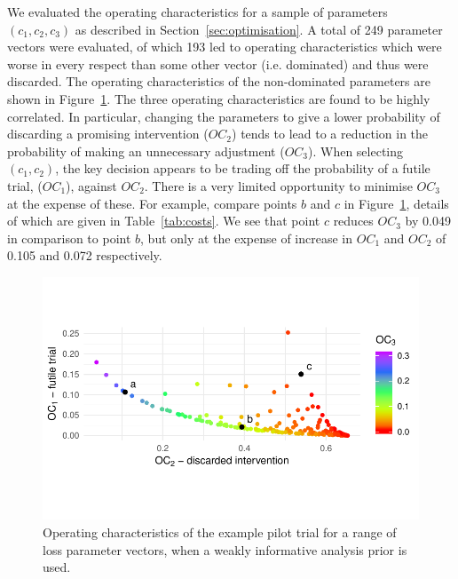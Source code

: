 \documentclass[AMA,STIX1COL]{WileyNJD-v2}
\begin{document}

We evaluated the operating characteristics for a sample of parameters $(c_1, c_2, c_3)$ as described in Section~\ref{sec:optimisation}. A total of 249 parameter vectors were evaluated, of which 193 led to operating characteristics which were worse in every respect than some other vector (i.e. dominated) and thus were discarded. The operating characteristics of the non-dominated parameters are shown in Figure~\ref{fig:p_front}. The three operating characteristics are found to be highly correlated. In particular, changing the parameters to give a lower probability of discarding a promising intervention ($OC_2$) tends to lead to a reduction in the probability of making an unnecessary adjustment ($OC_3$). When selecting $(c_1, c_2)$, the key decision appears to be trading off the probability of a futile trial, ($OC_{1}$), against $OC_{2}$. There is a very limited opportunity to minimise $OC_{3}$ at the expense of these. For example, compare points $b$ and $c$ in Figure~\ref{fig:p_front}, details of which are given in Table~\ref{tab:costs}. We see that point $c$ reduces $OC_3$ by 0.049 in comparison to point $b$, but only at the expense of increase in $OC_1$ and $OC_2$ of 0.105 and 0.072 respectively.

\begin{figure}
\centering
\includegraphics[scale=0.8]{./Figures/p_front}
\caption{Operating characteristics of the example pilot trial for a range of loss parameter vectors, when a weakly informative analysis prior is used.}
\label{fig:p_front}
\end{figure}
\end{document}
